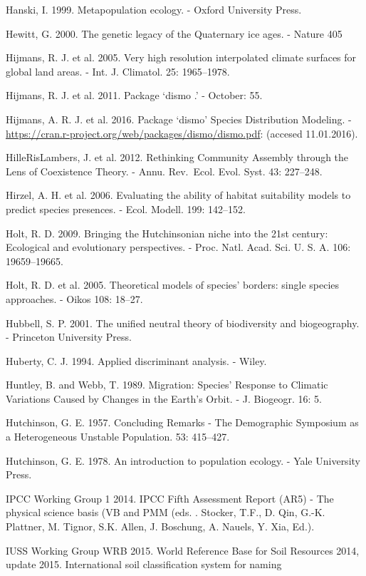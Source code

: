 \documentclass[11pt,twoside]{reedthesis}
\begin{document}
Hanski, I. 1999. Metapopulation ecology. - Oxford University Press.\par
Hewitt, G. 2000. The genetic legacy of the Quaternary ice ages. - Nature
405\par
Hijmans, R. J. et al. 2005. Very high resolution interpolated climate
surfaces for global land areas. - Int. J. Climatol. 25: 1965--1978.\par
Hijmans, R. J. et al. 2011. Package `dismo .' - October: 55.\par
Hijmans, A. R. J. et al. 2016. Package `dismo' Species Distribution
Modeling. -
\url{https://cran.r-project.org/web/packages/dismo/dismo.pdf}: (accesed
11.01.2016).\par
HilleRisLambers, J. et al. 2012. Rethinking Community Assembly through
the Lens of Coexistence Theory. - Annu. Rev.~Ecol. Evol. Syst. 43:
227--248.\par
Hirzel, A. H. et al. 2006. Evaluating the ability of habitat suitability
models to predict species presences. - Ecol. Modell. 199: 142--152.\par
Holt, R. D. 2009. Bringing the Hutchinsonian niche into the 21st
century: Ecological and evolutionary perspectives. - Proc. Natl. Acad.
Sci. U. S. A. 106: 19659--19665.\par
Holt, R. D. et al. 2005. Theoretical models of species' borders: single
species approaches. - Oikos 108: 18--27.\par
Hubbell, S. P. 2001. The unified neutral theory of biodiversity and
biogeography. - Princeton University Press.\par
Huberty, C. J. 1994. Applied discriminant analysis. - Wiley.\par
Huntley, B. and Webb, T. 1989. Migration: Species' Response to Climatic
Variations Caused by Changes in the Earth's Orbit. - J. Biogeogr. 16:
5.\par
Hutchinson, G. E. 1957. Concluding Remarks - The Demographic Symposium
as a Heterogeneous Unstable Population. 53: 415--427.\par
Hutchinson, G. E. 1978. An introduction to population ecology. - Yale
University Press.\par
IPCC Working Group 1 2014. IPCC Fifth Assessment Report (AR5) - The
physical science basis (VB and PMM (eds. . Stocker, T.F., D. Qin, G.-K.
Plattner, M. Tignor, S.K. Allen, J. Boschung, A. Nauels, Y. Xia,
Ed.).\par
IUSS Working Group WRB 2015. World Reference Base for Soil Resources
2014, update 2015. International soil classification system for naming
\end{document}
